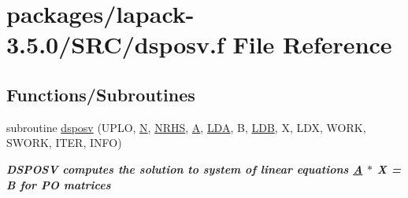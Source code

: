 \hypertarget{dsposv_8f}{}\section{packages/lapack-\/3.5.0/\+S\+R\+C/dsposv.f File Reference}
\label{dsposv_8f}
\subsection*{Functions/\+Subroutines}
\begin{DoxyCompactItemize}
\item 
subroutine \hyperlink{group__doublePOsolve_ga91ea95252aad898ccba02b2ebd7eab22}{dsposv} (U\+P\+L\+O, \hyperlink{polmisc_8c_a0240ac851181b84ac374872dc5434ee4}{N}, \hyperlink{example__user_8c_aa0138da002ce2a90360df2f521eb3198}{N\+R\+H\+S}, \hyperlink{classA}{A}, \hyperlink{example__user_8c_ae946da542ce0db94dced19b2ecefd1aa}{L\+D\+A}, B, \hyperlink{example__user_8c_a50e90a7104df172b5a89a06c47fcca04}{L\+D\+B}, X, L\+D\+X, W\+O\+R\+K, S\+W\+O\+R\+K, I\+T\+E\+R, I\+N\+F\+O)
\begin{DoxyCompactList}\small\item\em {\bfseries  D\+S\+P\+O\+S\+V computes the solution to system of linear equations \hyperlink{classA}{A} $\ast$ X = B for P\+O matrices} \end{DoxyCompactList}\end{DoxyCompactItemize}
